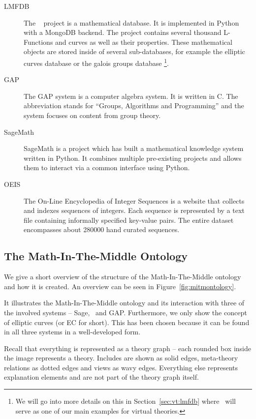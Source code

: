 \begin{description}
  \item[LMFDB]
    The \lmfdb\ \cite{lmfdb} project is a mathematical database. 
    It is implemented in Python with a MongoDB backend. 
    The project contains several thousand L-Functions and curves as well as their properties.
    These mathematical objects are stored inside of several sub-databases, for example the elliptic curves database or the galois groups database
    \footnote{We will go into more details on this in Section~\ref{sec:vt:lmfdb} where \lmfdb\ will serve as one of our main examples for virtual theories. }. 
  \item[GAP]
    The GAP system \cite{gap} is a computer algebra system. 
    It is written in C. 
    The abbreviation stands for ``Groups, Algorithms and Programming'' and the system focuses on content from group theory. 
  \item[SageMath]
    SageMath \cite{sagemath} is a project which has built a mathematical knowledge system written in Python. 
    It combines multiple pre-existing projects and allows them to interact via a common interface using Python. 
  \item[OEIS]
    The On-Line Encyclopedia of Integer Sequences \cite{oeis} is a website that collects and indexes sequences of integers. 
    Each sequence is represented by a text file containing informally specified key-value pairs. 
    The entire dataset encompasses about 280000 hand curated sequences. 
\end{description}

\subsection{The Math-In-The-Middle Ontology}\label{sec:mitm:ontology}



We give a short overview of the structure of the Math-In-The-Middle ontology and how it is created. 
An overview can be seen in Figure~\ref{fig:mitmontology}. 

It illustrates the Math-In-The-Middle ontology and its interaction with three of the involved systems -- Sage, \lmfdb\ and GAP. 
Furthermore, we only show the concept of elliptic curves (or EC for short). 
This has been chosen because it can be found in all three systems in a well-developed form. 

Recall that everything is represented as a theory graph -- each rounded box inside the image represents a theory. 
Includes are shown as solid edges, meta-theory relations as dotted edges and views as wavy edges. 
Everything else represents explanation elements and are not part of the theory graph itself. 

